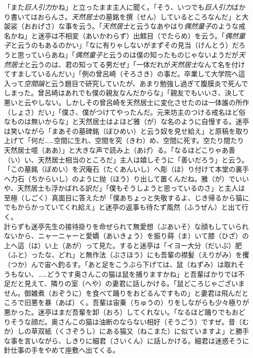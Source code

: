 \documentclass{book}
\begin{document}
「また\emph{巨人引力}かね」と立ったまま主人に聞く。「そう、いつでも\emph{巨人引力}ばかり書いてはおらんさ。\emph{天然居士}の墓銘を撰（せん）しているところなんだ」と大袈裟（おおげさ）な事を云う。「\emph{天然居士}と云うなあやはり\emph{偶然童子}のような戒名かね」と迷亭は不相変（あいかわらず）出鱈目（でたらめ）を云う。「\emph{偶然童子}と云うのもあるのかい」「なに有りゃしないがまずその見当（けんとう）だろうと思っていらあね」「\emph{偶然童子}と云うのは僕の知ったものじゃないようだが\emph{天然居士}と云うのは、君の知ってる男だぜ」「一体だれが\emph{天然居士}なんて名を付けてすましているんだい」「例の曾呂崎（そろさき）の事だ。卒業して大学院へ這入って\emph{空間論}と云う題目で研究していたが、あまり勉強し過ぎて腹膜炎で死んでしまった。曾呂崎はあれでも僕の親友なんだからな」「親友でもいいさ、決して悪いと云やしない。しかしその曾呂崎を天然居士に変化させたのは一体誰の所作（しょさ）だい」「僕さ、僕がつけてやったんだ。元来坊主のつける戒名ほど俗なものは無いからな」と天然居士はよほど雅（が）な名のように自慢する。迷亭は笑いながら「まあその墓碑銘（ぼひめい）と云う奴を見せ給え」と原稿を取り上げて「何だ\ldots{}\ldots{}空間に生れ、空間を究（きわ）め、空間に死す。空たり間たり天然居士噫（ああ）」と大きな声で読み上（あげ）る。「なるほどこりゃあ善（い）い、天然居士相当のところだ」主人は嬉しそうに「善いだろう」と云う。「この墓銘（ぼめい）を沢庵石（たくあんいし）へ彫（ほ）り付けて本堂の裏手へ力石（ちからいし）のように抛（ほう）り出して置くんだね。雅（が）でいいや、天然居士も浮かばれる訳だ」「僕もそうしようと思っているのさ」と主人は至極（しごく）真面目に答えたが「僕あちょっと失敬するよ、じき帰るから猫にでもからかっていてくれ給え」と迷亭の返事も待たず風然（ふうぜん）と出て行く。\\
計らずも迷亭先生の接待掛りを命ぜられて無愛想（ぶあいそ）な顔もしていられないから、ニャーニャーと愛嬌（あいきょう）を振り蒔（ま）いて膝（ひざ）の上へ這（は）い上（あが）って見た。すると迷亭は「イヨー大分（だいぶ）肥（ふと）ったな、どれ」と無作法（ぶさほう）にも吾輩の襟髪（えりがみ）を攫（つか）んで宙へ釣るす。「あと足をこうぶら下げては、鼠（ねずみ）は取れそうもない、\ldots{}\ldots{}どうです奥さんこの猫は鼠を捕りますかね」と吾輩ばかりでは不足だと見えて、隣りの室（へや）の妻君に話しかける。「鼠どころじゃございません。御雑煮（おぞうに）を食べて踊りをおどるんですもの」と妻君は飛んだところで旧悪を暴（あば）く。吾輩は宙乗（ちゅうの）りをしながらも少々極りが悪かった。迷亭はまだ吾輩を卸（おろ）してくれない。「なるほど踊りでもおどりそうな顔だ。奥さんこの猫は油断のならない相好（そうごう）ですぜ。昔（むか）しの草双紙（くさぞうし）にある猫又（ねこまた）に似ていますよ」と勝手な事を言いながら、しきりに細君（さいくん）に話しかける。細君は迷惑そうに針仕事の手をやめて座敷へ出てくる。\\
\end{document}
